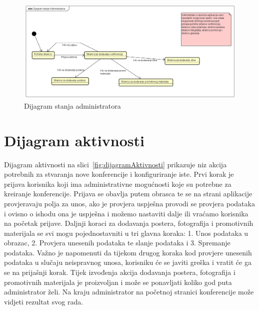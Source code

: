 			\begin{figure}[H]
				\includegraphics[width=\textwidth]{slike/adminStanja.PNG} %
				\caption{Dijagram stanja administratora}
				\label{fig:adminStanje} %
			\end{figure}
		


			\eject

		\section{Dijagram aktivnosti}

			Dijagram aktivnosti na slici~\ref{fig:dijagramAktivnosti} prikazuje niz akcija potrebnih za stvaranja nove konferencije i konfiguriranje iste. Prvi korak je prijava korisnika koji ima administrativne mogućnosti koje su potrebne za kreiranje konferencije. Prijava se obavlja putem obrasca te se na strani aplikacije provjeravaju polja za unos, ako je provjera uspješna provodi se provjera podataka i ovisno o ishodu ona je uspješna i možemo nastaviti dalje ili vraćamo korisnika na početak prijave. Daljnji koraci za dodavanja postera, fotografija i promotivnih materijala se svi mogu pojednostavniti u tri glavna koraka: 1. Unos podataka u obrazac, 2. Provjera unesenih podataka te slanje podataka i 3. Spremanje podataka. Važno je napomenuti da tijekom drugog koraka kod provjere unesenih podataka u slučaju neispravnog unosa, korisniku će se javiti greška i vratit će ga se na prijašnji korak. Tijek izvođenja akcija dodavanja postera, fotografija i promotivnih materijala je proizvoljan i može se ponavljati koliko god puta administrator želi. Na kraju administrator na početnoj stranici konferencije može vidjeti rezultat svog rada.
			
